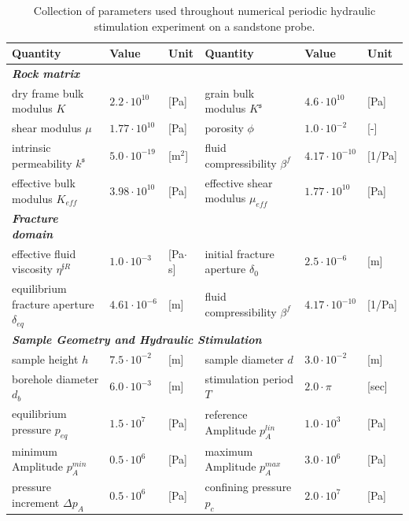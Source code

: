 \begin{table}[htb]
\centering
\begin{adjustbox}{angle=90}%
\begin{tabular}{llllll}\hline
\rule[1.9ex]{0ex}{1ex}\bf{Quantity} & \bf{Value} & \bf{Unit} & \bf{Quantity} & \bf{Value} & \bf{Unit} \\[1.1ex]\hline
\textbf{\textit{Rock matrix}} &&&&&  \\
dry frame bulk modulus $K$ & $2.2 \cdot 10^{10}$ & [Pa] & grain bulk modulus $K^\mathfrak{s}$ & $4.6\cdot 10^{10}$ & [Pa] \\
shear modulus $\mu$ & $1.77 \cdot 10^{10}$ & [Pa] & porosity $\phi$ & $1.0\cdot10^{-2}$ & [-]  \\
intrinsic permeability $k^\mathfrak{s}$ & $5.0 \cdot 10^{-19}$  & [$\text{m}^2$] &  
fluid compressibility $\beta^f$  & $4.17 \cdot 10^{-10}$  & [1/Pa] \\
effective bulk modulus $K_{eff}$ & $3.98 \cdot 10^{10}$  & [Pa] &  effective shear modulus $\mu_{eff}$  
& $1.77 \cdot 10^{10}$  & [Pa] \\
\textbf{\textit{Fracture domain}} &&&&&  \\
effective fluid viscosity $\eta^{\mathfrak{f}R}$ & $1.0\cdot10^{-3}$ & [Pa$\cdot$s] & 
initial fracture aperture $\delta_0$ & $2.5 \cdot 10^{-6}$ & [m]\\
equilibrium fracture aperture $\delta_{eq}$ & $4.61 \cdot 10^{-6}$ & [m] &  
fluid compressibility $\beta^f$  & $4.17 \cdot 10^{-10}$  & [1/Pa] \\
\multicolumn{5}{l}{\textbf{\textit{Sample Geometry and Hydraulic Stimulation}}}  \\
sample height $h$ & $7.5\cdot10^{-2}$ & [m] &
sample diameter $d$ & $3.0\cdot10^{-2}$ & [m] \\
borehole diameter $d_b$ & $6.0\cdot10^{-3}$ & [m] &
stimulation period $T$ & $2.0\cdot \pi$ & [sec] \\
equilibrium pressure $p_{eq}$ & $1.5\cdot10^{7}$ & [Pa] &
reference Amplitude $p_A^{lin}$ & $1.0\cdot10^{3}$ & [Pa] \\
minimum Amplitude $p_{A}^{min}$ & $0.5\cdot10^{6}$ & [Pa] &
maximum Amplitude $p_{A}^{max}$ & $3.0\cdot10^{6}$ & [Pa] \\
pressure increment $\Delta p_{A}$ & $0.5\cdot10^{6}$ & [Pa] &
confining pressure $p_{c}$ & $2.0\cdot10^{7}$ & [Pa] \\
\hline
\end{tabular}
\end{adjustbox}
\caption{Collection of parameters used throughout numerical periodic hydraulic stimulation experiment on a sandstone probe.}
\label{tab:non_conformal_parameters}
\end{table}

